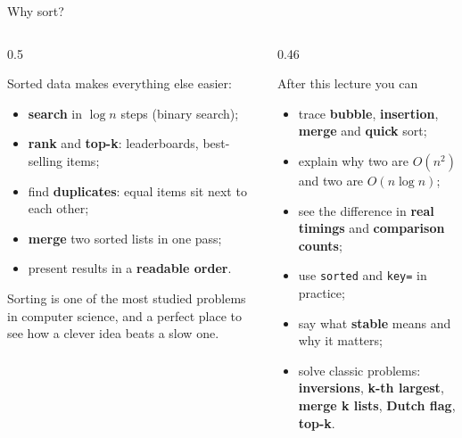 \documentclass[aspectratio=169,10pt]{beamer}
\begin{document}
\begin{frame}[plain]\titlepage\end{frame}

\begin{frame}{Why sort?}
\begin{columns}[T]
\begin{column}{0.5\textwidth}
{\small
Sorted data makes everything else easier:
\begin{itemize}\setlength\itemsep{3pt}
\item \textbf{search} in $\log n$ steps (binary search);
\item \textbf{rank} and \textbf{top-k}: leaderboards, best-selling items;
\item find \textbf{duplicates}: equal items sit next to each other;
\item \textbf{merge} two sorted lists in one pass;
\item present results in a \textbf{readable order}.
\end{itemize}
Sorting is one of the most studied problems in computer science, and a perfect place to see how a clever idea beats a slow one.}
\end{column}
\begin{column}{0.46\textwidth}
\begin{block}{After this lecture you can}
{\small
\begin{itemize}\setlength\itemsep{2pt}
\item trace \textbf{bubble}, \textbf{insertion}, \textbf{merge} and \textbf{quick} sort;
\item explain why two are $O(n^2)$ and two are $O(n\log n)$;
\item see the difference in \textbf{real timings} and \textbf{comparison counts};
\item use \texttt{sorted} and \texttt{key=} in practice;
\item say what \textbf{stable} means and why it matters;
\item solve classic problems: \textbf{inversions}, \textbf{k-th largest}, \textbf{merge k lists}, \textbf{Dutch flag}, \textbf{top-k}.
\end{itemize}}
\end{block}
\end{column}
\end{columns}
\end{frame}
\end{document}

